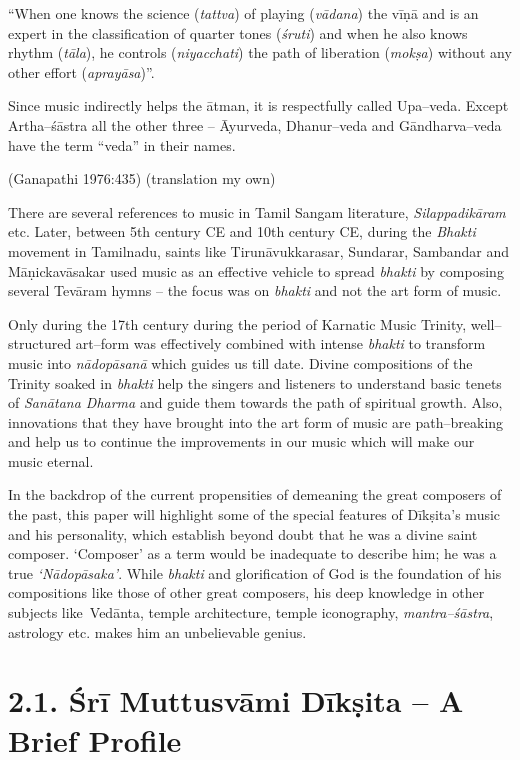 “When one knows the science (\textit{tattva}) of playing (\textit{vādana}) the vīṇā and is an expert in the classification of quarter tones (\textit{śruti}) and when he also knows rhythm (\textit{tāla}), he controls (\textit{niyacchati}) the path of liberation (\textit{mokṣa}) without any other effort (\textit{aprayāsa})”.

Since music indirectly helps the ātman, it is respectfully called Upa–veda. Except Artha–śāstra all the other three – Āyurveda, Dhanur–veda and Gāndharva–veda have the term “veda” in their names.

\begin{flushright}
(Ganapathi 1976:435) (translation my own)
\end{flushright}

There are several references to music in Tamil Sangam literature, \textit{Silappadikāram} etc. Later, between 5th century CE and 10th century CE, during the \textit{Bhakti} movement in Tamilnadu, saints like Tirunāvukkarasar, Sundarar, Sambandar and Māṇickavāsakar used music as an effective vehicle to spread \textit{bhakti} by composing several Tevāram hymns – the focus was on \textit{bhakti} and not the art form of music.

Only during the 17th century during the period of Karnatic Music Trinity, well–structured art–form was effectively combined with intense \textit{bhakti} to transform music into \textit{nādopāsanā} which guides us till date. Divine compositions of the Trinity soaked in \textit{bhakti} help the singers and listeners to understand basic tenets of \textit{Sanātana Dharma} and guide them towards the path of spiritual growth. Also, innovations that they have brought into the art form of music are path–breaking and help us to continue the improvements in our music which will make our music eternal.

In the backdrop of the current propensities of demeaning the great composers of the past, this paper will highlight some of the special features of Dīkṣita’s music and his personality, which establish beyond doubt that he was a divine saint composer. ‘Composer’ as a term would be inadequate to describe him; he was a true \textit{‘Nādopāsaka’}. While \textit{bhakti} and glorification of God is the foundation of his compositions like those of other great composers, his deep knowledge in other subjects like Vedānta, temple architecture, temple iconography, \textit{mantra–śāstra}, astrology etc. makes him an unbelievable genius.


\section*{2.1. Śrī Muttusvāmi Dīkṣita – A Brief Profile}

